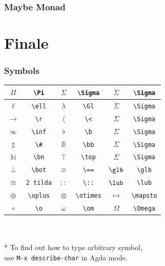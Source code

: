 \documentclass[xetex]{beamer}
\begin{document}
\begin{frame}
\frametitle{Maybe Monad}
\end{frame}


\section{Finale}

\begin{frame}
  \frametitle{Symbols}
  \begin{center}
  \begin{tabular}{ | c | c | c | c | c | c | }
  \hline
    $\Pi$ & \texttt{\textbackslash Pi}
    & $\Sigma$ & \texttt{\textbackslash Sigma}
    & $\Sigma$ & \texttt{\textbackslash Sigma}
    \\  \hline
    $\ell$ & \texttt{\textbackslash ell}
    & $\lambda$ & \texttt{\textbackslash Gl}
    & $\Sigma$ & \texttt{\textbackslash Sigma}
    \\  \hline
    $\rightarrow$ & \texttt{\textbackslash r}
    & $\langle$ & \texttt{\textbackslash <}
    & $\Sigma$ & \texttt{\textbackslash Sigma}
    \\  \hline
    $\infty$ & \texttt{\textbackslash inf}
    & $\flat$ & \texttt{\textbackslash b}
    & $\Sigma$ & \texttt{\textbackslash Sigma}
    \\  \hline
    $\sharp$ & \texttt{\textbackslash \#}
    & $\mathbb{B}$ & \texttt{\textbackslash bb}
    & $\Sigma$ & \texttt{\textbackslash Sigma}
    \\  \hline
    $\mathbb{N}$ & \texttt{\textbackslash bn}
    & $\top$ & \texttt{\textbackslash top}
    & $\Sigma$ & \texttt{\textbackslash Sigma}
    \\  \hline
    $\bot$ & \texttt{\textbackslash bot}
    & $\equiv$ & \texttt{\textbackslash ==}
    & $\glb$ & \texttt{\textbackslash glb}
    \\  \hline
    $\cong$ & \texttt{2 tilda}
    & $::$ & \texttt{\textbackslash ::}
    & $\lub$ & \texttt{\textbackslash lub}
    \\  \hline
    $\oplus$ & \texttt{\textbackslash oplus}
    & $\otimes$ & \texttt{\textbackslash otimes}
    & $\mapsto$ & \texttt{\textbackslash mapsto}
    \\  \hline
    $\circ$ & \texttt{\textbackslash o}
    & $\omega$ & \texttt{\textbackslash om}
    & $\Omega$ & \texttt{\textbackslash Omega}
    \\  \hline 
  \end{tabular}
  \\ \\ * To find out how to type arbitrary symbol,
  \\ use \texttt{M-x describe-char} in Agda mode.
  \end{center}
\end{frame}
\end{document}
